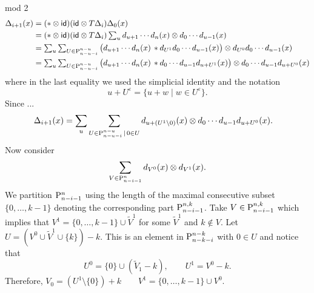 \documentclass{amsart}
\begin{document}
	\newpage
	mod 2
	\begin{align*}
		\Delta_{i+1}(x) &=
		(\ast \otimes \mathsf{id})(\mathsf{id} \otimes T\Delta_i) \Delta_0(x) \\ &=
		(\ast \otimes \mathsf{id})(\mathsf{id} \otimes T\Delta_i) \textstyle\sum_u d_{u+1} \dotsm d_n(x) \otimes d_{0} \dotsm d_{u-1}(x) \\ &=
		\textstyle\sum_u \sum_{U \in \mathrm{P}^{n-u}_{n-u-i}} \big( d_{u+1} \dotsm d_n(x) \, \ast d_{U^1} d_{0} \dotsm d_{u-1}(x) \big) \otimes d_{U^0} d_{0} \dotsm d_{u-1}(x) \\ &=
		\textstyle\sum_u \sum_{U \in \mathrm{P}^{n-u}_{n-u-i}} \big( d_{u+1} \dotsm d_n(x) \, \ast d_{0} \dotsm d_{u-1} d_{u+U^1}(x) \big) \otimes d_{0} \dotsm d_{u-1} d_{u+U^0}(x)
	\end{align*}
	where in the last equality we used the simplicial identity and the notation
	\[
	u+U^\varepsilon = \{u+w \mid w\in U^\varepsilon\}.
	\]
	Since ...
	\begin{align*}
		\Delta_{i+1}(x) &=
		\sum_u \sum_{U \in \mathrm{P}^{n-u}_{n-u-i} \,|\, 0 \in U} d_{u+(U^1 \setminus 0)}(x) \otimes d_{0} \dotsm d_{u-1} d_{u+U^0}(x).
	\end{align*}
	Now consider
	\[
	\sum_{V \in \mathrm{P}^{n}_{n-i-1}} d_{V^0}(x) \otimes d_{V^1}(x).
	\]
	We partition $\mathrm{P}^{n}_{n-i-1}$ using the length of the maximal consecutive subset $\{0,\dots,k-1\}$ denoting the corresponding part $\mathrm{P}^{n,k}_{n-i-1}$.
	Take $V \in \mathrm{P}^{n,k}_{n-i-1}$ which implies that $V^1 = \{0,\dots,k-1\} \cup \widetilde V^1$ for some $\widetilde V^1$ and $k \notin V$.
	Let $U = (V^0 \cup \widetilde V^1 \cup \{k\})-k$.
	This is an element in $\mathrm{P}^{n-k}_{n-k-i}$ with $0 \in U$ and notice that
	\[
	U^0 = \{0\} \cup (\widetilde V_1-k),
	\qquad
	U^1 = V^0-k.
	\]
	Therefore,
	$V_0 = (U^1 \setminus \{0\})+k
	\qquad
	V^1 = \{0,\dots,k-1\} \cup V^0$.
\end{document}
